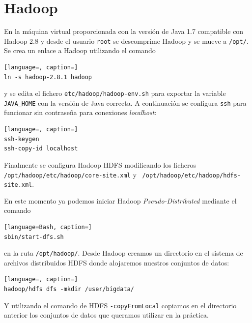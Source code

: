 \documentclass[10pt,swedish, openany]{book}
\begin{document}
\tableofcontents{}

\clearpage


\clearpage


\mainmatter




\chapter{Hadoop}

En la máquina virtual proporcionada con la versión de Java 1.7 compatible con Hadoop 2.8 y desde el usuario \texttt{root} se descomprime Hadoop y se mueve a \texttt{/opt/}. Se crea un enlace a Hadoop utilizando el comando 
\begin{lstlisting}[language=, caption=]
ln -s hadoop-2.8.1 hadoop
\end{lstlisting}
y se edita el fichero \texttt{etc/hadoop/hadoop-env.sh} para exportar la variable \texttt{JAVA\_HOME} con la versión de Java correcta. A continuación se configura \texttt{ssh} para funcionar sin contraseña para conexiones \textit{localhost}:
  \begin{lstlisting}[language=, caption=]
ssh-keygen 
ssh-copy-id localhost
\end{lstlisting}

Finalmente se configura Hadoop HDFS modificando los ficheros \texttt{ /opt/hadoop/etc/hadoop/core-site.xml} y \texttt{ /opt/hadoop/etc/hadoop/hdfs-site.xml}.

En este momento ya podemos iniciar Hadoop \textit{Pseudo-Distributed} mediante el comando
\begin{lstlisting}[language=Bash, caption=]
sbin/start-dfs.sh
\end{lstlisting}
en la ruta \texttt{/opt/hadoop/}.
Desde Hadoop creamos un directorio en el sistema de archivos distribuidos HDFS donde alojaremos nuestros conjuntos de datos:
  \begin{lstlisting}[language=, caption=]
hadoop/hdfs dfs -mkdir /user/bigdata/
  \end{lstlisting}

Y utilizando el comando de HDFS \texttt{-copyFromLocal} copiamos en el directorio anterior los conjuntos de datos que queramos utilizar en la práctica. 
\end{document}
